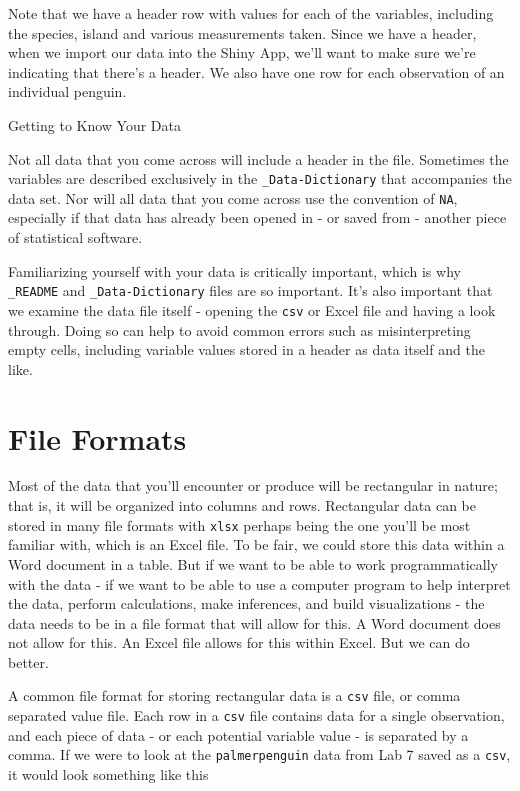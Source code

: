 \documentclass[
]{book}
\begin{document}
Note that we have a header row with values for each of the variables, including the species, island and various measurements taken. Since we have a header, when we import our data into the Shiny App, we'll want to make sure we're indicating that there's a header. We also have one row for each observation of an individual penguin.

Getting to Know Your Data

Not all data that you come across will include a header in the file. Sometimes the variables are described exclusively in the \texttt{\_Data-Dictionary} that accompanies the data set. Nor will all data that you come across use the convention of \texttt{NA}, especially if that data has already been opened in - or saved from - another piece of statistical software.

Familiarizing yourself with your data is critically important, which is why \texttt{\_README} and \texttt{\_Data-Dictionary} files are so important. It's also important that we examine the data file itself - opening the \texttt{csv} or Excel file and having a look through. Doing so can help to avoid common errors such as misinterpreting empty cells, including variable values stored in a header as data itself and the like.

\hypertarget{file-formats}{%
\section*{File Formats}\label{file-formats}}

Most of the data that you'll encounter or produce will be rectangular in nature; that is, it will be organized into columns and rows. Rectangular data can be stored in many file formats with \texttt{xlsx} perhaps being the one you'll be most familiar with, which is an Excel file. To be fair, we could store this data within a Word document in a table. But if we want to be able to work programmatically with the data - if we want to be able to use a computer program to help interpret the data, perform calculations, make inferences, and build visualizations - the data needs to be in a file format that will allow for this. A Word document does not allow for this. An Excel file allows for this within Excel. But we can do better.

A common file format for storing rectangular data is a \texttt{csv} file, or comma separated value file. Each row in a \texttt{csv} file contains data for a single observation, and each piece of data - or each potential variable value - is separated by a comma. If we were to look at the \texttt{palmerpenguin} data from Lab 7 saved as a \texttt{csv}, it would look something like this
\end{document}
